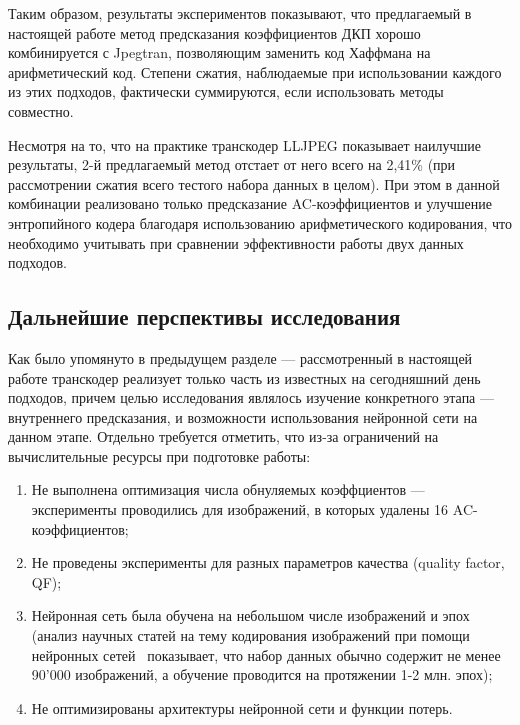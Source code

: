 \documentclass[times,specification,annotation]{itmo-student-thesis}
\begin{document}
Таким образом, результаты экспериментов показывают, что предлагаемый в настоящей работе метод предсказания коэффициентов ДКП хорошо комбинируется с Jpegtran, позволяющим заменить код Хаффмана на арифметический код. Степени сжатия, наблюдаемые при использовании каждого из этих подходов, фактически суммируются, если использовать методы совместно.\par

Несмотря на то, что на практике транскодер LLJPEG показывает наилучшие результаты, 2-й предлагаемый метод отстает от него всего на 2,41\% (при рассмотрении сжатия всего тестого набора данных в целом). При этом в данной комбинации реализовано только предсказание AC-коэффициентов и улучшение энтропийного кодера благодаря использованию арифметического кодирования, что необходимо учитывать при сравнении эффективности работы двух данных подходов.

\subsection{Дальнейшие перспективы исследования}\label{chapter:prospects}

Как было упомянуто в предыдущем разделе --- рассмотренный в настоящей работе транскодер реализует только часть из известных на сегодняшний день подходов, причем целью исследования являлось изучение конкретного этапа --- внутреннего предсказания, и возможности использования нейронной сети на данном этапе. Отдельно требуется отметить, что из-за ограничений на вычислительные ресурсы при подготовке работы:
\begin{enumerate}
    \item Не выполнена оптимизация числа обнуляемых коэффциентов --- эксперименты проводились для изображений, в которых удалены 16 AC-коэффициентов;
    \item Не проведены эксперименты для разных параметров качества (quality factor, QF);
    \item Нейронная сеть была обучена на небольшом числе изображений и эпох (анализ научных статей на тему кодирования изображений при помощи нейронных сетей~\cite{jeon2023contextbased, feng2023nvtc, huang2023accurate} показывает, что набор данных обычно содержит не менее 90'000 изображений, а обучение проводится на протяжении 1-2 млн. эпох);
    \item Не оптимизированы архитектуры нейронной сети и функции потерь.
\end{enumerate}
\end{document}
